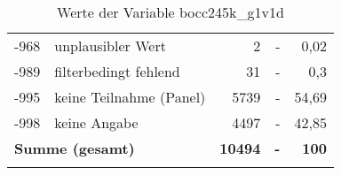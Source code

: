 \begin{longtable}{Xlrrr}
       -968 & unplausibler Wert & 2 & - & 0,02 \\

       -989 & filterbedingt fehlend & 31 & - & 0,3 \\

       -995 & keine Teilnahme (Panel) & 5739 & - & 54,69 \\

       -998 & keine Angabe & 4497 & - & 42,85 \\

     \midrule
     \multicolumn{2}{l}{\textbf{Summe (gesamt)}} & \textbf{10494} & \textbf{-} & \textbf{100} \\
     \bottomrule
     \caption{Werte der Variable bocc245k\_g1v1d}
     \end{longtable}
     
